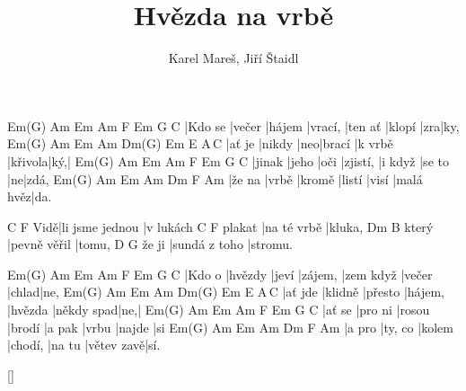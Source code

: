 \documentclass{song}
\title{Hvězda na vrbě}
\author{Karel Mareš, Jiří Štaidl}
\begin{document}
\strophe
Em(G)   Am     Em     Am      F       Em     G   C
|Kdo se |večer |hájem |vrací, |ten ať |klopí |zra|ky,
Em(G)  Am     Em  Am     Dm(G\7) Em         E   A\,C
|ať je |nikdy |neo|brací |k vrbě |křivola|ký,|
Em(G)  Am    Em   Am       F       Em     G  C
|jinak |jeho |oči |zjistí, |i když |se to |ne|zdá,
Em(G)  Am    Em     Am     Dm    F         Am
|že na |vrbě |kromě |listí |visí |malá hvěz|da.
\endstrophe

    C               F
Vidě|li jsme jednou |v lukách
       C           F
plakat |na té vrbě |kluka,
      Dm           B
který |pevně věřil |tomu,
      D\7           G
že ji |sundá z toho |stromu.
\endstrophe

\strophe
Em(G)  Am      Em    Am      F         Em     G     C
|Kdo o |hvězdy |jeví |zájem, |zem když |večer |chlad|ne,
Em(G)   Am      Em      Am      Dm(G\7) Em         E   A\,C
|ať jde |klidně |přesto |hájem, |hvězda |někdy spad|ne,|
Em(G)  Am      Em     Am     F      Em    G      C
|ať se |pro ni |rosou |brodí |a pak |vrbu |najde |si
Em(G)  Am      Em     Am      Dm     F          Am
|a pro |ty, co |kolem |chodí, |na tu |větev zavě|sí.
\endstrophe

\ref{}
\end{document}

